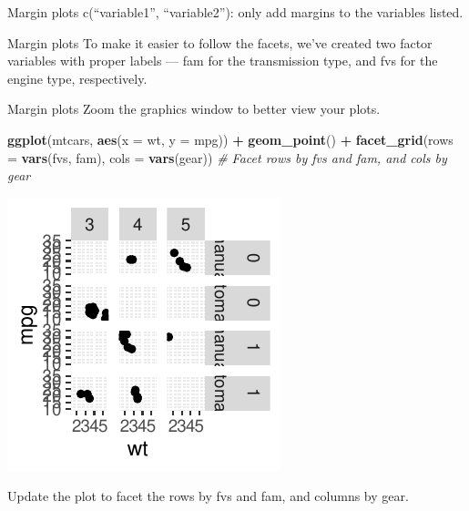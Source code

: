 \documentclass[
  ignorenonframetext,
]{beamer}
\newenvironment{Shaded}{\begin{snugshade}}{\end{snugshade}}
\newcommand{\AttributeTok}[1]{\textcolor[rgb]{0.13,0.29,0.53}{#1}}
\newcommand{\CommentTok}[1]{\textcolor[rgb]{0.56,0.35,0.01}{\textit{#1}}}
\newcommand{\FunctionTok}[1]{\textcolor[rgb]{0.13,0.29,0.53}{\textbf{#1}}}
\newcommand{\NormalTok}[1]{#1}
\newcommand{\SpecialCharTok}[1]{\textcolor[rgb]{0.81,0.36,0.00}{\textbf{#1}}}
\begin{document}
\begin{frame}{Margin plots}
\label{margin-plots-2}
c(``variable1'', ``variable2''): only add margins to the variables
listed.
\end{frame}

\begin{frame}{Margin plots}
\label{margin-plots-3}
To make it easier to follow the facets, we've created two factor
variables with proper labels --- fam for the transmission type, and fvs
for the engine type, respectively.
\end{frame}

\begin{frame}[fragile]{Margin plots}
\label{margin-plots-4}
Zoom the graphics window to better view your plots.


\begin{Shaded}
\begin{Highlighting}[]
\FunctionTok{ggplot}\NormalTok{(mtcars, }\FunctionTok{aes}\NormalTok{(}\AttributeTok{x =}\NormalTok{ wt, }\AttributeTok{y =}\NormalTok{ mpg)) }\SpecialCharTok{+} \FunctionTok{geom\_point}\NormalTok{() }\SpecialCharTok{+} \FunctionTok{facet\_grid}\NormalTok{(}\AttributeTok{rows =} \FunctionTok{vars}\NormalTok{(fvs,}
\NormalTok{    fam), }\AttributeTok{cols =} \FunctionTok{vars}\NormalTok{(gear))  }\CommentTok{\# Facet rows by fvs and fam, and cols by gear}
\end{Highlighting}
\end{Shaded}

\begin{center}\includegraphics[width=0.5\linewidth]{Figs/unnamed-chunk-98-1} \end{center}

Update the plot to facet the rows by fvs and fam, and columns by gear.


\end{frame}
\end{document}
